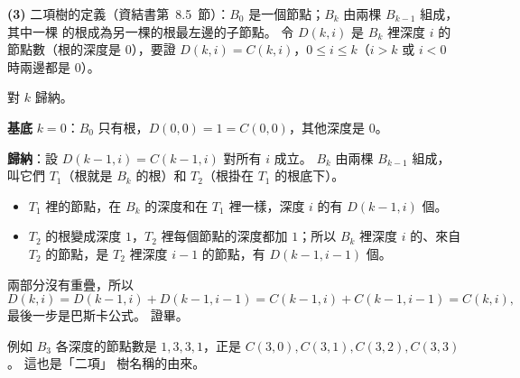\begin{pastsoln}
\textbf{(3)} 二項樹的定義（資結書第~8.5~節）：$B_0$ 是一個節點；$B_k$ 由兩棵 $B_{k-1}$ 組成，其中一棵
的根成為另一棵的根最左邊的子節點。 令 $D(k, i)$ 是 $B_k$ 裡深度 $i$ 的節點數（根的深度是 $0$），要證
$D(k, i) = C(k, i)$，$0 \le i \le k$（$i > k$ 或 $i < 0$ 時兩邊都是 $0$）。

對 $k$ 歸納。

\textbf{基底} $k = 0$：$B_0$ 只有根，$D(0, 0) = 1 = C(0, 0)$，其他深度是 $0$。

\textbf{歸納}：設 $D(k-1, i) = C(k-1, i)$ 對所有 $i$ 成立。 $B_k$ 由兩棵 $B_{k-1}$ 組成，叫它們
$T_1$（根就是 $B_k$ 的根）和 $T_2$（根掛在 $T_1$ 的根底下）。
\begin{itemize}
\item $T_1$ 裡的節點，在 $B_k$ 的深度和在 $T_1$ 裡一樣，深度 $i$ 的有 $D(k-1, i)$ 個。
\item $T_2$ 的根變成深度 $1$，$T_2$ 裡每個節點的深度都加 $1$；所以 $B_k$ 裡深度 $i$ 的、來自 $T_2$
的節點，是 $T_2$ 裡深度 $i - 1$ 的節點，有 $D(k-1, i-1)$ 個。
\end{itemize}
兩部分沒有重疊，所以
\[
D(k, i) = D(k-1, i) + D(k-1, i-1) = C(k-1, i) + C(k-1, i-1) = C(k, i),
\]
最後一步是巴斯卡公式。 證畢。

例如 $B_3$ 各深度的節點數是 $1, 3, 3, 1$，正是 $C(3, 0), C(3, 1), C(3, 2), C(3, 3)$。 這也是「二項」
樹名稱的由來。
\end{pastsoln}
